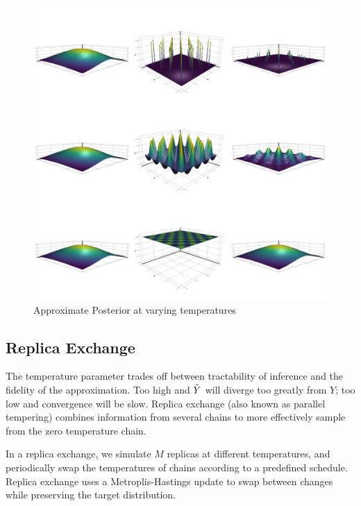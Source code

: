 \begin{figure}\label{temppost}
\includegraphics[width=\linewidth]{approxpost.png}
\caption{Approximate Posterior at varying temperatures}
\end{figure}



\subsection{Replica Exchange}

The temperature parameter trades off between tractability of inference and the fidelity of the approximation.
Too high and $\tilde{Y}$ will diverge too greatly from $Y$; too low and convergence will be slow.
Replica exchange (also known as parallel tempering) \citep{swendsen1986replica} combines information from several chains to more  effectively sample from the zero temperature chain.

In a replica exchange, we simulate $M$ replicas at different temperatures, and periodically swap the temperatures of chains according to a predefined schedule.
Replica exchange uses a Metroplis-Hastings update to swap between changes while preserving the target distribution.

